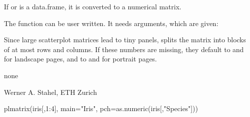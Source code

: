 \documentclass{article}
\begin{document}
\begin{Details}\relax
If  or  is a data.frame, it is converted to a
numerical matrix.

The  function can be user written. It needs  arguments,
which are given:

Since large scatterplot matrices lead to tiny panels, 
splits the matrix into blocks of at most  rows and
 columns. If these numbers are missing, they default to
 and  for landscape pages, and to
 and  for portrait pages.
\end{Details}
\begin{Value}
none
\end{Value}
\begin{Author}\relax
Werner A. Stahel, ETH Zurich
\end{Author}
\begin{SeeAlso}\relax
{}
\end{SeeAlso}
\begin{Examples}
\begin{ExampleCode}
plmatrix(iris[,1:4], main="Iris", pch=as.numeric(iris[,"Species"]))
\end{ExampleCode}
\end{Examples}
\end{document}
